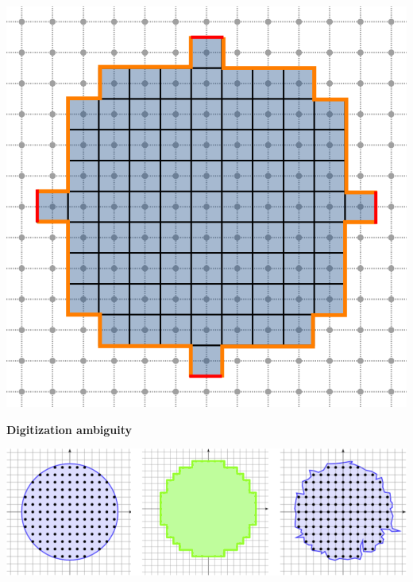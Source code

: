\begin{frame}
\begin{minipage}{0.33\textwidth}
\includegraphics[scale=0.22]{figures/motivation/exact-sampling/digital-ball-perimeter.png}
\end{minipage}%
\vspace{1em}
%
\pause
%
\textbf{Digitization ambiguity}
\begin{center}
\includegraphics[scale=1]{figures/motivation/exact-sampling/ambiguity.png}
\end{center}
\end{frame}

